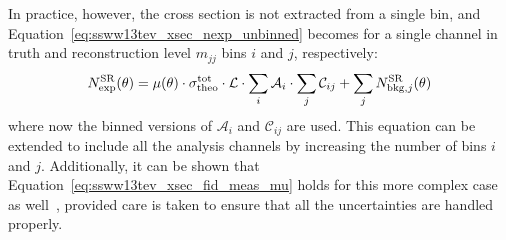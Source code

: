In practice, however, the cross section is not extracted from a single bin, and Equation~\ref{eq:ssww13tev_xsec_nexp_unbinned} becomes for a single channel in truth and reconstruction level $m_{jj}$ bins $i$ and $j$, respectively:
\begin{equation}
  N_{\textrm{exp}}^{\textrm{SR}}(\theta) = \mu(\theta)\cdot\sigma_{\textrm{theo}}^{\textrm{tot}}\cdot\mathcal{L}\cdot\sum\limits_i\mathcal{A}_i\cdot\sum\limits_j\mathcal{C}_{ij}+\sum\limits_j N_{\textrm{bkg},j}^{\textrm{SR}}(\theta)
\end{equation}
where now the binned versions of $\mathcal{A}_i$ and $\mathcal{C}_{ij}$ are used.
This equation can be extended to include all the analysis channels by increasing the number of bins $i$ and $j$.
Additionally, it can be shown that Equation~\ref{eq:ssww13tev_xsec_fid_meas_mu} holds for this more complex case as well~\cite{2018.ssww-13tev-atlas-support}, provided care is taken to ensure that all the uncertainties are handled properly.


